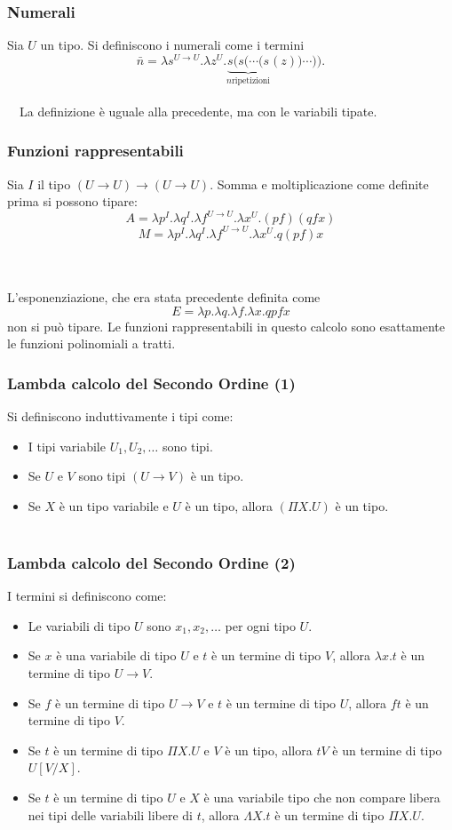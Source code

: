 \documentclass{beamer}
\renewcommand{\l}{\lambda}
\renewcommand{\L}{\Lambda}
\newcommand{\ar}{\rightarrow}
\begin{document}
\begin{frame}
    \frametitle{Numerali}
    Sia $U$ un tipo. Si definiscono i numerali come i termini
    \[
        \bar{n} = \l s^{U\ar U}. \l z^{U}. \underbrace{s ( s ( \cdots (s}_{n\text{
            ripetizioni}} (z))\cdots )).
    \]
    \\~\
    La definizione \`e uguale alla precedente, ma con le variabili tipate.
\end{frame}


\begin{frame}
    \frametitle{Funzioni rappresentabili}

    Sia $I$ il tipo $(U\ar U)\ar (U\ar U)$.
    Somma e moltiplicazione come definite prima si possono tipare:
    \[
        A = \l p^I. \l q^I. \l f^{U\ar U}. \l x^U. (pf)(qfx)
    \]
    \[
            M = \l p^I. \l q^I. \l f^{U\ar U}. \l x^U. q(pf)x
    \]
    \\~\
    
    L'esponenziazione, che era stata precedente definita come
    \[
        E = \l p. \l q. \l f. \l x. qpfx
    \]
    non si pu\`o tipare. Le funzioni rappresentabili in questo calcolo sono
    esattamente le funzioni polinomiali a tratti.
\end{frame}

\begin{frame} 
    \frametitle{Lambda calcolo del Secondo Ordine (1)}
    Si definiscono induttivamente i tipi come:
    \begin{itemize}
        \item I tipi variabile $U_1, U_2, \dots$ sono tipi.
        \item Se $U$ e $V$ sono tipi $(U\ar V)$ \`e un tipo.
        \item Se $X$ \`e un tipo variabile e $U$ \`e un tipo, allora $(\Pi X.U)$
            \`e un tipo.
    \\~\
    \end{itemize}
\end{frame} 

\begin{frame} 
    \frametitle{Lambda calcolo del Secondo Ordine (2)}
    I termini si definiscono come:
    \begin{itemize}
        \item Le variabili di tipo $U$ sono $x_1, x_2, \dots$ per ogni tipo $U$.
        \item Se $x$ \`e una variabile di tipo $U$ e $t$ \`e un termine di tipo
            $V$, allora $\l x. t$ \`e un termine di tipo $U\ar V$.
        \item Se $f$ \`e un termine di tipo $U\ar V$ e $t$ \`e un termine di
            tipo $U$, allora $ft$ \`e un termine di tipo $V$.
        \item Se $t$ \`e un termine di tipo $\Pi X. U$ e $V$ \`e un tipo, allora
            $tV$ \`e un termine di tipo $U[V/X]$.
        \item Se $t$ \`e un termine di tipo $U$ e $X$ \`e una variabile tipo che
            non compare libera nei tipi delle variabili libere di $t$, allora
            $\L X. t$ \`e un termine di tipo $\Pi X. U$.
    \end{itemize}
\end{frame} 
\end{document}

